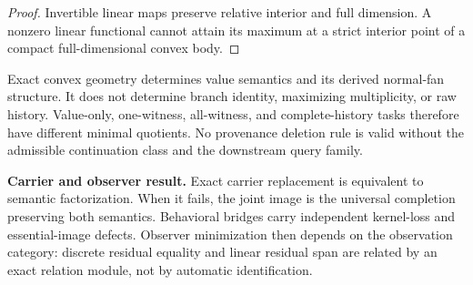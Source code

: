 \begin{proof}
Invertible linear maps preserve relative interior and full dimension.  A nonzero linear functional cannot attain its maximum at a strict interior point of a compact full-dimensional convex body.
\end{proof}

\begin{boundary}
\label{bnd:block18-provenance-boundary}
Exact convex geometry determines value semantics and its derived normal-fan structure.  It does not determine branch identity, maximizing multiplicity, or raw history.  Value-only, one-witness, all-witness, and complete-history tasks therefore have different minimal quotients.  No provenance deletion rule is valid without the admissible continuation class and the downstream query family.
\end{boundary}

\begin{resultbox}
\textbf{Carrier and observer result.}
Exact carrier replacement is equivalent to semantic factorization.  When it fails, the joint image is the universal completion preserving both semantics.  Behavioral bridges carry independent kernel-loss and essential-image defects.  Observer minimization then depends on the observation category: discrete residual equality and linear residual span are related by an exact relation module, not by automatic identification.
\end{resultbox}
